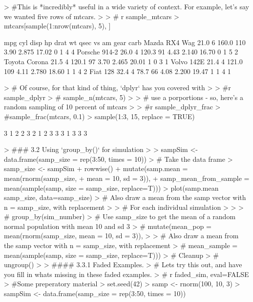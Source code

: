 \documentclass{article}
\begin{document}
\begin{Schunk}
\begin{Sinput}
> #This is *incredibly* useful in a wide variety of context. For example, let's say we wanted five rows of mtcars.
> 
> # r sample_mtcars
> mtcars[sample(1:nrow(mtcars), 5), ]
\end{Sinput}
\begin{Soutput}
               mpg cyl  disp  hp drat    wt  qsec vs am gear carb
Mazda RX4 Wag 21.0   6 160.0 110 3.90 2.875 17.02  0  1    4    4
Porsche 914-2 26.0   4 120.3  91 4.43 2.140 16.70  0  1    5    2
Toyota Corona 21.5   4 120.1  97 3.70 2.465 20.01  1  0    3    1
Volvo 142E    21.4   4 121.0 109 4.11 2.780 18.60  1  1    4    2
Fiat 128      32.4   4  78.7  66 4.08 2.200 19.47  1  1    4    1
\end{Soutput}
\begin{Sinput}
> # Of course, for that kind of thing, `dplyr` has you covered with
> 
> #r sample_dplyr
> # sample_n(mtcars, 5)
> 
> #  use a porportions - so, here's a random sampling of 10 percent of mtcars
> 
> #r sample_dplyr_frac
> #sample_frac(mtcars, 0.1)
> sample(1:3, 15, replace = TRUE)
\end{Sinput}
\begin{Soutput}
 [1] 3 1 2 2 3 2 1 2 3 3 3 1 3 3 3
\end{Soutput}
\begin{Sinput}
> ### 3.2 Using `group_by()` for simulation
> 
> sampSim <- data.frame(samp_size = rep(3:50, times = 10))
> # Take the data frame
> samp_size <- sampSim %>%
+    rowwise() %>%
+      mutate(samp.mean = mean(rnorm(samp_size,
+                                    mean = 10, sd = 3)),
+      samp_mean_from_sample = mean(sample(samp, size = samp_size, replace=T)))
> plot(samp.mean ~ samp_size, data=samp_size)
> # Also draw a mean from the samp vector with n = samp_size, with replacement
> 
> # For each individual simulation
> 
> 
> #     group_by(sim_number) %>%
> # Use samp_size to get the mean of a random normal population with mean 10 and sd 3
> #  mutate(mean_pop = mean(rnorm(samp_size, mean = 10, sd = 3)),
> 
> # Also draw a mean from the samp vector with n = samp_size, with replacement
> #         mean_sample = mean(sample(samp, size = samp_size, replace=T))) %>%
> # Cleanup
> #    ungroup()
> 
> #### 3.3.1 Faded Examples.
> # Lets try this out, and have you fill in whats missing in these faded examples.
> # r faded_sim, eval=FALSE
> #Some preperatory material
> set.seed(42)
> samp <- rnorm(100, 10, 3)
> sampSim <- data.frame(samp_size = rep(3:50, times = 10))

\end{Sinput}
\end{Schunk}
\end{document}
